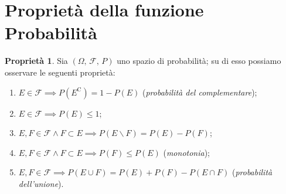 \documentclass[12pt,openany]{amsbook}
\theoremstyle{plain}
\numberwithin{equation}{section} %
\theoremstyle{definition}
\newtheorem{prty}[thm]{Proprietà}
\begin{document}
        \section{Proprietà della funzione Probabilità}
        \begin{prty}\label{prty:Proprietà_funzione_probabilità}
                Sia $(\Omega,\,\mathscr{F},\,P)$ uno spazio di probabilità; su di esso possiamo osservare le seguenti proprietà:
                \begin{enumerate}
                    \item $E \in \mathscr{F} \implies P(E^{\text{C}}) = 1 - P(E)$ (\textit{probabilità del complementare});
                    \item $E \in \mathscr{F} \implies P(E) \leq 1$;
                    \item $E,F \in \mathscr{F} \land F \subset E \implies P(E \backslash F) = P(E) - P(F)$;
                    \item $E,F \in \mathscr{F} \land F \subset E \implies P(F) \leq P(E)$ (\textit{monotonia});
                    \item $E,F \in \mathscr{F} \implies P(E \cup F) = P(E) + P(F) - P(E \cap F)$ (\textit{probabilità dell'unione}).
                \end{enumerate}
            \end{prty}
\end{document}
